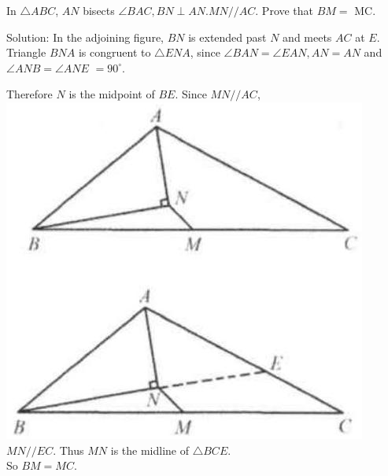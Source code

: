 \documentclass{article}
\begin{document}
In \(\triangle A B C\), \(A N\) bisects \(\angle B A C, B N \perp A N . M N / / A C\). Prove that \(B M=\) MC.

Solution:
In the adjoining figure, \(B N\) is extended past \(N\) and meets \(A C\) at \(E\). Triangle \(B N A\) is congruent to \(\triangle E N A\), since \(\angle B A N=\angle E A N, A N=A N\) and \(\angle A N B=\angle A N E\) \(=90^{\circ}\).

Therefore \(N\) is the midpoint of \(B E\). Since \(M N / / A C\),\\
\includegraphics[width=\textwidth]{images/055(1).jpg} \(M N / / E C\). Thus \(M N\) is the midline of \(\triangle B C E\).\\
So \(B M=M C\).
\end{document}

